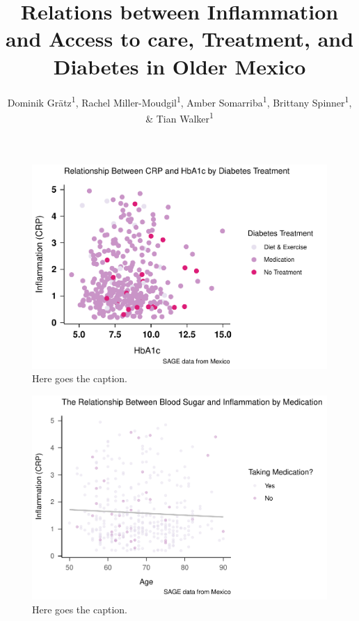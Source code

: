 \documentclass[
  man]{apa6}
\title{Relations between Inflammation and Access to care, Treatment, and Diabetes in Older Mexico}
\author{Dominik Grätz\textsuperscript{1}, Rachel Miller-Moudgil\textsuperscript{1}, Amber Somarriba\textsuperscript{1}, Brittany Spinner\textsuperscript{1}, \& Tian Walker\textsuperscript{1}}
\date{}
\affiliation{\vspace{0.5cm}\textsuperscript{1} University of Oregon}
\begin{document}
\maketitle

\begin{figure}[H]
\includegraphics{NEW_Final_Groupof5_files/figure-latex/tian-fig-hba1c-65-1} \caption{Here goes the caption.}\label{fig:tian-fig-hba1c-65}
\end{figure}



\begin{figure}[H]
\includegraphics{NEW_Final_Groupof5_files/figure-latex/RQ1plot-1} \caption{Here goes the caption.}\label{fig:RQ1plot}
\end{figure}
\end{document}
